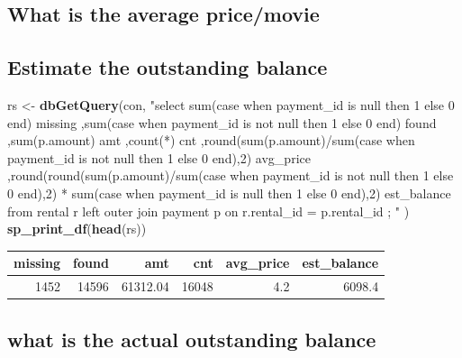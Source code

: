 \documentclass[]{book}
\newenvironment{Shaded}{\begin{snugshade}}{\end{snugshade}}
\newcommand{\KeywordTok}[1]{\textcolor[rgb]{0.13,0.29,0.53}{\textbf{#1}}}
\newcommand{\NormalTok}[1]{#1}
\newcommand{\StringTok}[1]{\textcolor[rgb]{0.31,0.60,0.02}{#1}}
\theoremstyle{definition}
\theoremstyle{definition}
\theoremstyle{definition}
\theoremstyle{remark}
\begin{document}
\hypertarget{what-is-the-average-pricemovie}{%
\subsection{What is the average
price/movie}\label{what-is-the-average-pricemovie}}

\hypertarget{estimate-the-outstanding-balance}{%
\subsection{Estimate the outstanding
balance}\label{estimate-the-outstanding-balance}}

\begin{Shaded}
\begin{Highlighting}[]
\NormalTok{rs <-}\StringTok{ }\KeywordTok{dbGetQuery}\NormalTok{(con,}
                \StringTok{"select sum(case when payment_id is null then 1 else 0 end) missing}
\StringTok{                       ,sum(case when payment_id is not null then 1 else 0 end) found}
\StringTok{                       ,sum(p.amount) amt}
\StringTok{                       ,count(*) cnt }
\StringTok{                       ,round(sum(p.amount)/sum(case when payment_id is not null then 1 else 0 end),2) avg_price}
\StringTok{                       ,round(round(sum(p.amount)/sum(case when payment_id is not null then 1 else 0 end),2)}
\StringTok{                                  * sum(case when payment_id is null then 1 else 0 end),2) est_balance}
\StringTok{                   from rental r }
\StringTok{                        left outer join payment p }
\StringTok{                          on r.rental_id = p.rental_id  }
\StringTok{                 ;}
\StringTok{                "}
\NormalTok{                )}
\KeywordTok{sp_print_df}\NormalTok{(}\KeywordTok{head}\NormalTok{(rs))}
\end{Highlighting}
\end{Shaded}

\begin{tabular}{r|r|r|r|r|r}
\hline
missing & found & amt & cnt & avg\_price & est\_balance\\
\hline
1452 & 14596 & 61312.04 & 16048 & 4.2 & 6098.4\\
\hline
\end{tabular}

\hypertarget{what-is-the-actual-outstanding-balance}{%
\subsection{what is the actual outstanding
balance}\label{what-is-the-actual-outstanding-balance}}
\end{document}
